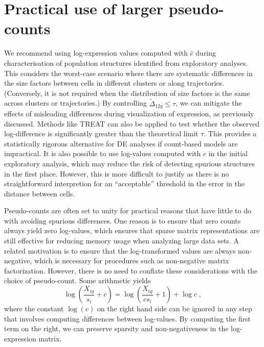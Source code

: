 \documentclass[10pt,letterpaper]{article}
\begin{document}
\section{Practical use of larger pseudo-counts}
We recommend using log-expression values computed with $\hat c$ during characterisation of population structures identified from exploratory analyses.
This considers the worst-case scenario where there are systematic differences in the size factors between cells in different clusters or along trajectories. 
(Conversely, it is not required when the distribution of size factors is the same across clusters or trajectories.)
By controlling $\tilde\Delta_{12g} \le \tau$, we can mitigate the effects of misleading differences during visualization of expression, as previously discussed.
Methods like TREAT \cite{mccarthy2009testing} can also be applied to test whether the observed log-difference is significantly greater than the theoretical limit $\tau$.
This provides a statistically rigorous alternative for DE analyses if count-based models are impractical.
It is also possible to use log-values computed with $\hat c$ in the initial exploratory analysis, which may reduce the risk of detecting spurious structures in the first place.
However, this is more difficult to justify as there is no straightforward interpretion for an ``acceptable'' threshold in the error in the distance between cells.

Pseudo-counts are often set to unity for practical reasons that have little to do with avoiding spurious differences.
One reason is to ensure that zero counts always yield zero log-values, which ensures that sparse matrix representations are still effective for reducing memory usage when analyzing large data sets.
A related motivation is to ensure that the log-transformed values are always non-negative, which is necessary for procedures such as non-negative matrix factorization.
However, there is no need to conflate these considerations with the choice of pseudo-count.
Some arithmetic yields 
\[
 \log\left(\frac{X_{ig}}{s_i}+ c\right) = \log\left(\frac{X_{ig}}{cs_i}+ 1\right) + \log c \;,
\]
where the constant $\log(c)$ on the right hand side can be ignored in any step that involves computing differences between log-values.
By computing the first term on the right, we can preserve sparsity and non-negativeness in the log-expression matrix.
\end{document}
